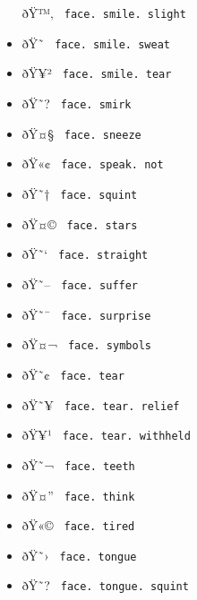\begin{itemize}
  \label{symbol-face.smile.slight}{{ ðŸ™‚ }
  \texttt{\ face.\ smile.\ slight\ }}
\item
  \label{symbol-face.smile.sweat}{{ ðŸ˜ }
  \texttt{\ face.\ smile.\ sweat\ }}
\item
  \label{symbol-face.smile.tear}{{ ðŸ¥² }
  \texttt{\ face.\ smile.\ tear\ }}
\item
  \label{symbol-face.smirk}{{ ðŸ˜? }
  \texttt{\ face.\ smirk\ }}
\item
  \label{symbol-face.sneeze}{{ ðŸ¤§ }
  \texttt{\ face.\ sneeze\ }}
\item
  \label{symbol-face.speak.not}{{ ðŸ«¢ }
  \texttt{\ face.\ speak.\ not\ }}
\item
  \label{symbol-face.squint}{{ ðŸ˜† }
  \texttt{\ face.\ squint\ }}
\item
  \label{symbol-face.stars}{{ ðŸ¤© }
  \texttt{\ face.\ stars\ }}
\item
  \label{symbol-face.straight}{{ ðŸ˜` }
  \texttt{\ face.\ straight\ }}
\item
  \label{symbol-face.suffer}{{ ðŸ˜-- }
  \texttt{\ face.\ suffer\ }}
\item
  \label{symbol-face.surprise}{{ ðŸ˜¯ }
  \texttt{\ face.\ surprise\ }}
\item
  \label{symbol-face.symbols}{{ ðŸ¤¬ }
  \texttt{\ face.\ symbols\ }}
\item
  \label{symbol-face.tear}{{ ðŸ˜¢ }
  \texttt{\ face.\ tear\ }}
\item
  \label{symbol-face.tear.relief}{{ ðŸ˜¥ }
  \texttt{\ face.\ tear.\ relief\ }}
\item
  \label{symbol-face.tear.withheld}{{ ðŸ¥¹ }
  \texttt{\ face.\ tear.\ withheld\ }}
\item
  \label{symbol-face.teeth}{{ ðŸ˜¬ }
  \texttt{\ face.\ teeth\ }}
\item
  \label{symbol-face.think}{{ ðŸ¤'' }
  \texttt{\ face.\ think\ }}
\item
  \label{symbol-face.tired}{{ ðŸ«© }
  \texttt{\ face.\ tired\ }}
\item
  \label{symbol-face.tongue}{{ ðŸ˜› }
  \texttt{\ face.\ tongue\ }}
\item
  \label{symbol-face.tongue.squint}{{ ðŸ˜? }
  \texttt{\ face.\ tongue.\ squint\ }}

\end{itemize}
